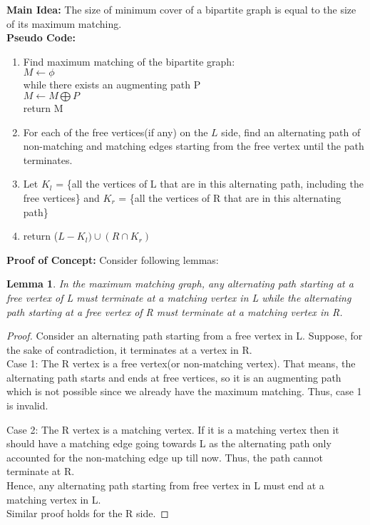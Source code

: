 \documentclass[11pt]{article}
\newtheorem{lemma}[theorem]{Lemma}
\begin{document}
\textbf{Main Idea:}
The size of minimum cover of a bipartite graph is equal to the size of its maximum matching. \\
\textbf{Pseudo Code:}
\begin{enumerate}
	\item Find maximum matching of the bipartite graph: \\
	\indent $M \leftarrow \phi$ \\
			while there exists an augmenting path P \\
				$M \leftarrow M \bigoplus P$ \\
			return M
	\item For each of the free vertices(if any) on the $L$ side, find an alternating path of non-matching and matching edges
	starting from the free vertex until the path terminates.
	\item Let $K_l$ = \{all the vertices of L that are in this alternating path, including the free vertices\} and 
			  $K_r$ = \{all the vertices of R that are in this alternating path\}
	\item return ($L - K_l) \cup (R \cap K_r)$ 
\end{enumerate}
\textbf{Proof of Concept:}
Consider following lemmas:
\begin{lemma}
	In the maximum matching graph, any alternating path starting at a free vertex of L must terminate at a matching
	vertex in L while the alternating path starting at a free vertex of R must terminate at a matching vertex in R.
\end{lemma}
\begin{proof}
	Consider an alternating path starting from a free vertex in L. Suppose, for the sake of contradiction, it terminates at a 
	vertex in R. \\
	Case 1: The R vertex is a free vertex(or non-matching vertex). That means, the alternating path starts and ends at free 
	vertices, so it is an augmenting path which is not possible since we already have the maximum matching. Thus, case 1 is invalid.
	
	Case 2: The R vertex is a matching vertex. If it is a matching vertex then it should have a matching edge going towards L
	as the alternating path only accounted for the non-matching edge up till now.
	Thus, the path cannot terminate at R. \\
	Hence, any alternating path starting from free vertex in L must end at a matching vertex in L. \\
	Similar proof holds for the R side.
\end{proof}
\end{document}

